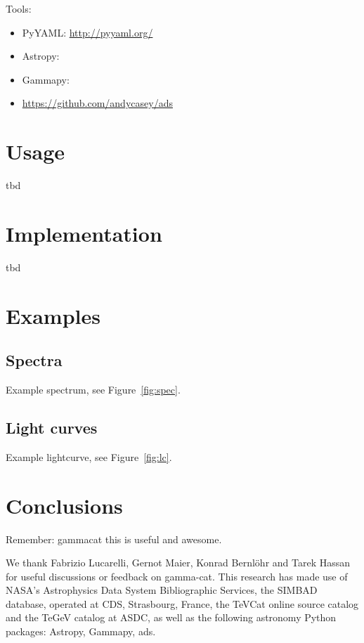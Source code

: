 \documentclass[11pt,twoside]{article}
\begin{document}
Tools:

\begin{itemize}
\item PyYAML: \url{http://pyyaml.org/}
\item Astropy: \citet{astropy}
\item Gammapy: \citet{gammapy}
\item \url{https://github.com/andycasey/ads}
\end{itemize}


\section{Usage}

tbd

\section{Implementation}

tbd

\section{Examples}

\subsection{Spectra}

Example spectrum, see Figure~\ref{fig:spec}.


\subsection{Light curves}

Example lightcurve, see Figure~\ref{fig:lc}.


\section{Conclusions}

Remember: gammacat this is useful and awesome.

\clearpage %

\acknowledgements We thank Fabrizio Lucarelli, Gernot Maier, Konrad Bernl\"ohr and Tarek Hassan for useful discussions or feedback on gamma-cat.
This research has made use of NASA's Astrophysics Data System Bibliographic Services, the SIMBAD database, operated at CDS, Strasbourg, France, the TeVCat online source catalog and the TeGeV catalog at ASDC, as well as the following astronomy Python packages: Astropy, Gammapy, ads.


\end{document}
